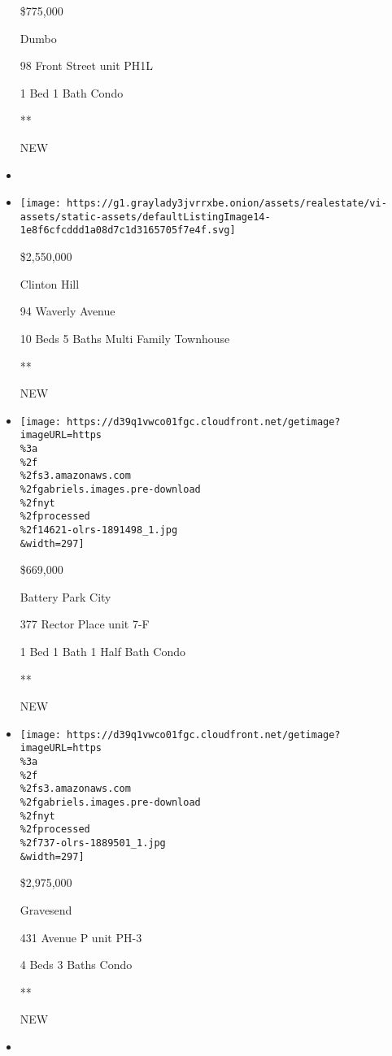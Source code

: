 \begin{itemize}
  \$775,000

  Dumbo

  98 Front Street unit PH1L

  1 Bed \textbar{} 1 Bath \textbar{} Condo

  **

  NEW
\item
\item
  \href{/real-estate/usa/ny/brooklyn/clinton-hill/homes-for-sale/94-waverly-avenue/12436-OLRS-0079241?}{}

  \texttt{[image: https://g1.graylady3jvrrxbe.onion/assets/realestate/vi-assets/static-assets/defaultListingImage14-1e8f6cfcddd1a08d7c1d3165705f7e4f.svg]}

  \$2,550,000

  Clinton Hill

  94 Waverly Avenue

  10 Beds \textbar{} 5 Baths \textbar{} Multi Family Townhouse

  **

  NEW
\item
  \href{/real-estate/usa/ny/new-york/battery-park-city/homes-for-sale/377-rector-place/14621-OLRS-1891498?}{}

  \texttt{[image: https://d39q1vwco01fgc.cloudfront.net/getimage?imageURL=https\\\%3a\\\%2f\\\%2fs3.amazonaws.com\\\%2fgabriels.images.pre-download\\\%2fnyt\\\%2fprocessed\\\%2f14621-olrs-1891498\_1.jpg\\\&width=297]}

  \$669,000

  Battery Park City

  377 Rector Place unit 7-F

  1 Bed \textbar{} 1 Bath \textbar{} 1 Half Bath \textbar{} Condo

  **

  NEW
\item
  \href{/real-estate/usa/ny/brooklyn/gravesend/homes-for-sale/431-avenue-p/737-OLRS-1889501?}{}

  \texttt{[image: https://d39q1vwco01fgc.cloudfront.net/getimage?imageURL=https\\\%3a\\\%2f\\\%2fs3.amazonaws.com\\\%2fgabriels.images.pre-download\\\%2fnyt\\\%2fprocessed\\\%2f737-olrs-1889501\_1.jpg\\\&width=297]}

  \$2,975,000

  Gravesend

  431 Avenue P unit PH-3

  4 Beds \textbar{} 3 Baths \textbar{} Condo

  **

  NEW
\item
  \href{/real-estate/usa/ny/staten-island/st-george/homes-for-sale/90-bay-street-landing-staten-island-ny-10301/403-1139196?}{}


\end{itemize}
